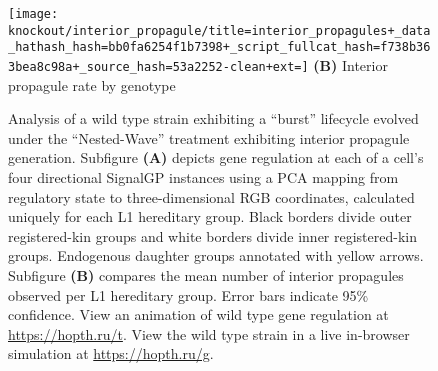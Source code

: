 \begin{figure}[!htbp]
\begin{center}
\begin{minipage}[t]{0.5\linewidth}
\begin{minipage}[t]{\linewidth}
\centering
\vspace{0pt} %
\begin{minipage}[b]{\linewidth}
\texttt{[image: knockout/interior\_propagule/title=interior\_propagules+\_data\_hathash\_hash=bb0fa6254f1b7398+\_script\_fullcat\_hash=f738b363bea8c98a+\_source\_hash=53a2252-clean+ext=]}%
{\textbf{(B)} Interior propagule rate by genotype}
\end{minipage}
\end{minipage}%
\hspace*{\fill}

\end{minipage}

\caption{
Analysis of a wild type strain exhibiting a ``burst'' lifecycle evolved under the ``Nested-Wave'' treatment exhibiting interior propagule generation.
Subfigure \textbf{(A)} depicts gene regulation at each of a cell's four directional SignalGP instances using a PCA mapping from regulatory state to three-dimensional RGB coordinates, calculated uniquely for each L1 hereditary group.
Black borders divide outer registered-kin groups and white borders divide inner registered-kin groups.
Endogenous daughter groups annotated with yellow arrows.
Subfigure \textbf{(B)} compares the mean number of interior propagules observed per L1 hereditary group.
Error bars indicate 95\% confidence.
View an animation of wild type gene regulation at \url{https://hopth.ru/t}.
View the wild type strain in a live in-browser simulation at \url{https://hopth.ru/g}.
}
\label{fig:ko-interior_propagule}
\end{center}
\end{figure}
